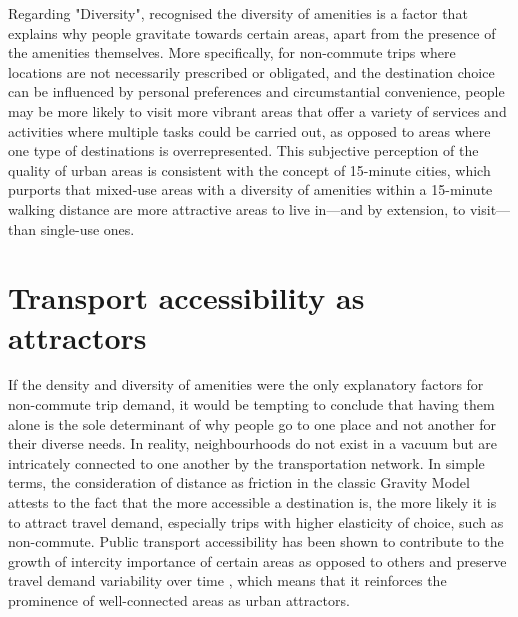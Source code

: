 Regarding "Diversity", \citet{cerveroTravelDemand3Ds1997} recognised the diversity of amenities is a factor that explains why people gravitate towards certain areas, apart from the presence of the amenities themselves. More specifically, for non-commute trips where locations are not necessarily prescribed or obligated, and the destination choice can be influenced by personal preferences and circumstantial convenience, people may be more likely to visit more vibrant areas that offer a variety of services and activities where multiple tasks could be carried out, as opposed to areas where one type of destinations is overrepresented. This subjective perception of the quality of urban areas is consistent with the concept of 15-minute cities, which purports that mixed-use areas with a diversity of amenities within a 15-minute walking distance are more attractive areas to live in---and by extension, to visit---than single-use ones. \citep{khavarian-garmsirGardenCity15Minute2023}

\section{Transport accessibility as attractors}

If the density and diversity of amenities were the only explanatory factors for non-commute trip demand, it would be tempting to conclude that having them alone is the sole determinant of why people go to one place and not another for their diverse needs. In reality, neighbourhoods do not exist in a vacuum but are intricately connected to one another by the transportation network. In simple terms, the consideration of distance as friction in the classic Gravity Model attests to the fact that the more accessible a destination is, the more likely it is to attract travel demand, especially trips with higher elasticity of choice, such as non-commute. Public transport accessibility has been shown to contribute to the growth of intercity importance of certain areas as opposed to others and preserve travel demand variability over time \citep{zhongMeasuringVariabilityMobility2015}, which means that it reinforces the prominence of well-connected areas as urban attractors. 

